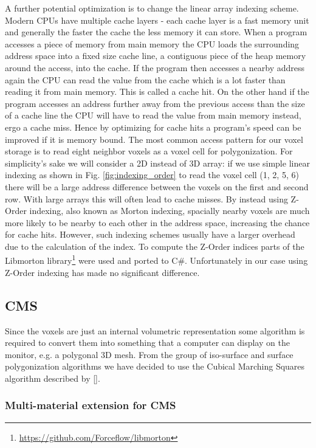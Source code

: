 A further potential optimization is to change the linear array indexing scheme. Modern CPUs have multiple cache layers - each cache layer is a fast memory unit and generally the faster the cache the less
memory it can store. When a program accesses a piece of memory from main memory the CPU loads the surrounding address space into a fixed size cache line, a contiguous piece of the heap memory around the access, into the cache.
If the program then accesses a nearby address again the CPU can read the value from the cache which is a lot faster than reading it from main memory. This is called a cache hit. On the other hand if the program accesses an address further away from the previous access than the size of a cache line the CPU will have to read the value from main memory instead, ergo a cache miss. Hence by optimizing for cache hits a program's speed can be improved if it is memory bound. The most
common access pattern for our voxel storage is to read eight neighbor voxels as a voxel cell for polygonization.
For simplicity's sake we will consider a 2D instead of 3D array: if we use simple linear indexing as shown in Fig. \ref{fig:indexing_order} to read the voxel cell (1, 2, 5, 6) there will be a large address difference between the voxels
on the first and second row. With large arrays this will often lead to cache misses. By instead using Z-Order indexing, also known as Morton indexing, spacially nearby voxels are much more likely to be nearby to each other in the address space, increasing the chance for cache hits. However, such indexing schemes usually have a larger overhead due to the calculation of the index. To compute the Z-Order indices parts of the Libmorton library\footnote{\url{https://github.com/Forceflow/libmorton}} were used and ported to C\#. Unfortunately in our case using Z-Order indexing has made no significant difference.


\subsection{CMS}

Since the voxels are just an internal volumetric representation some algorithm is required to convert them into something that a computer can
display on the monitor, e.g. a polygonal 3D mesh. From the group of iso-surface and surface polygonization algorithms we have decided to use the
Cubical Marching Squares algorithm described by [].

\subsubsection{Multi-material extension for CMS}

